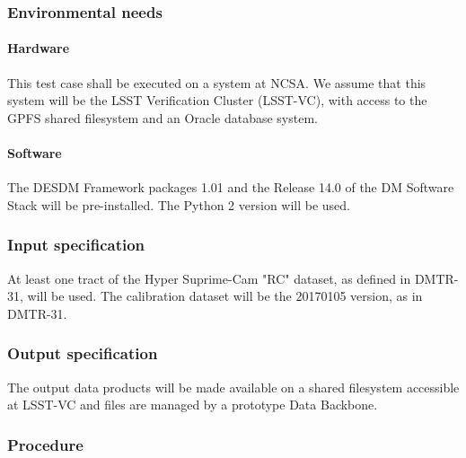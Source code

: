 \subsubsection{Environmental needs}

\paragraph{Hardware}

This test case shall be executed on a system at NCSA.
We assume that this system will be the LSST Verification Cluster (LSST-VC),
with access to the GPFS shared filesystem and an Oracle database system.

\paragraph{Software}

The DESDM Framework packages 1.01 and the Release 14.0 of the DM Software Stack will be pre-installed. The Python 2 version will be used.

\subsubsection{Input specification}

At least one tract of the Hyper Suprime-Cam "RC" dataset, as defined in DMTR-31, will be used.
The calibration dataset will be the 20170105 version, as in DMTR-31.


\subsubsection{Output specification}

The output data products will be made available on a shared filesystem accessible at LSST-VC and files are managed by a prototype Data Backbone.

\subsubsection{Procedure}

